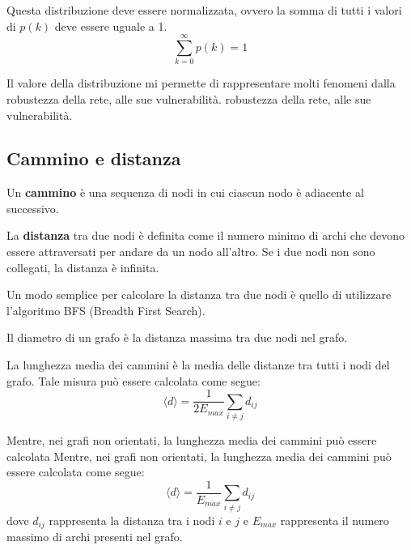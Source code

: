 \begin{nota}
    Questa distribuzione deve essere normalizzata, ovvero la somma di tutti i
    valori di $p(k)$ deve essere uguale a 1.
    \begin{equation*}
        \sum_{k=0}^{\infty} p(k) = 1
    \end{equation*}
\end{nota}
Il valore della distribuzione mi permette di rappresentare molti fenomeni dalla
robustezza della rete, alle sue vulnerabilità.
robustezza della rete, alle sue vulnerabilità.
\subsection{Cammino e distanza}
\begin{definizione}
    Un \textbf{cammino} è una sequenza di nodi in cui ciascun nodo è adiacente
    al successivo.
\end{definizione}
\begin{definizione}
    La \textbf{distanza} tra due nodi è definita come il numero minimo di archi
    che devono essere attraversati per andare da un nodo all'altro. Se i due
    nodi non sono collegati, la distanza è infinita.
\end{definizione}
Un modo semplice per calcolare la distanza tra due nodi è quello di utilizzare
l'algoritmo BFS (Breadth First Search).
\begin{definizione}
    Il diametro di un grafo è la distanza massima tra due nodi nel grafo.
\end{definizione}
\begin{definizione}
    La lunghezza media dei cammini è la media delle distanze tra tutti i nodi
    del grafo. Tale misura può essere calcolata come segue:
    \begin{equation}
        \langle d \rangle = \frac{1}{2E_{max}} \sum_{i \neq j} d_{ij}
    \end{equation}
\end{definizione}
Mentre, nei grafi non orientati, la lunghezza media dei cammini può essere calcolata
Mentre, nei grafi non orientati, la lunghezza media dei cammini può essere calcolata
come segue:
\begin{equation}
    \langle d \rangle = \frac{1}{E_{max}} \sum_{i \neq j} d_{ij}
\end{equation}
dove $d_{ij}$ rappresenta la distanza tra i nodi $i$ e $j$ e $E_{max}$ rappresenta
il numero massimo di archi presenti nel grafo.

